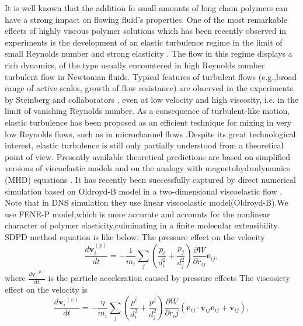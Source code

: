 \documentclass[aps,prl,twocolumn,showpacs,superscriptaddress,groupedaddress]{revtex4}  %
\begin{document}
It is well known that the addition fo small amounts of long chain polymers can have a strong impact on flowing fluid's properties.
One of the most remarkable effects of highly viscous polymer solutions which has been recently
observed in experiments is the development of an elastic turbulence regime in the limit of small Reynolds number and strong 
elasticity \cite{groisman00}. The flow in this regime displays a rich dynamics, of the type usually encountered
in high Reynolds number turbulent flow in Newtonian fluids. Typical features of turbulent flows (e.g.,broad
range of active scales, growth of flow resistance) are observed in the experiments by Steinberg and collaborators \cite{groisman00},
even at low velocity and high viscosity, i.e. in the limit of vanishing Reynolds number. As a consequence of 
turbulent-like motion, elastic turbulence has been proposed as an efficient technique for mixing in very
low Reynolds flows, such as in microchannel flows \cite{groisman01}.Despite its great technological interest, elastic turbulence
is still only partially understood from a theoretical point of view. Presently available theoretical predictions are
based on simplified versions of viscoelastic models and on the analogy with magnetohydrodynamics (MHD) equations \cite{balk01}\cite{fouxon03}. 
It has recently been successfully captured by direct numerical simulation based on Oldroyd-B model in a two-dimensional viscoelastic flow \cite{berti08}.
Note that in DNS simulation they use linear viscoelastic model(Oldroyd-B).We use FENE-P model,which is more accurate and accounts for the nonlinear character of polymer
elasticity,culminating in a finite molecular extensibility.\\
SDPD method equation is like below:
The pressure effect on the velocity
\begin{equation}\label{equ:momeevo}
 \frac{d\mathbf{v}_{i}^{(p)}}{dt}=-\frac{1}{m_i}\sum_j(\frac{p_i}{d_{i}^{2}}+\frac{p_j}{d_{j}^{2}})\frac{\partial W}{\partial r_{ij}}\mathbf{e}_{ij},
\end{equation}
where $\frac{d\mathbf{v}_{i}^{(p)}}{dt}$ is the particle acceleration caused by pressure
effects
The viscosicty effect on the velocity is 
\begin{equation}\label{equ:acceleration}
 \frac{d\mathbf{v}{_i}{^{(\upsilon)}}}{dt}=-\frac{\eta}{m_i}\sum_j\left(\frac{p^i}{d_{i}^{2}}+\frac{p^j}{d_{j}^{2}}\right)\frac{\partial W}{\partial r_ij}(\mathbf{e}_{ij}\cdot\mathbf{v}_{ij}\mathbf{e}_{ij}+\mathbf{v}_{ij}),
\end{equation}
\end{document}
